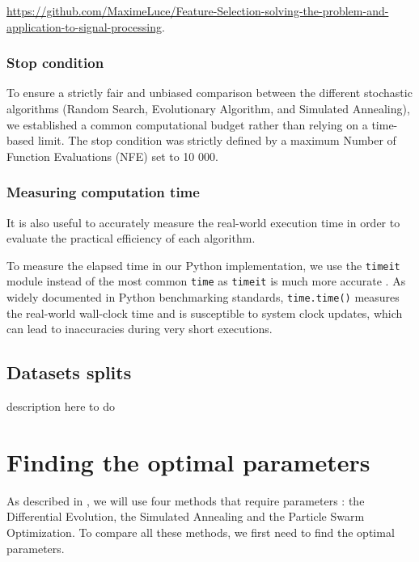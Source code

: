 \documentclass[12pt, openany]{article}
\begin{document}
\href{https://github.com/MaximeLuce/Feature-Selection-solving-the-problem-and-application-to-signal-processing}{\small https://github.com/MaximeLuce/Feature-Selection-solving-the-problem-and-application-to-signal-processing}.


\subsubsection{Stop condition}\label{sec:stop_condition}

To ensure a strictly fair and unbiased comparison between the different stochastic algorithms (Random Search, Evolutionary Algorithm, and Simulated Annealing), we established a common computational budget rather than relying on a time-based limit. The stop condition was strictly defined by a maximum Number of Function Evaluations (NFE) set to 10 000. 
 

\subsubsection{Measuring computation time}\label{sec:computation_time}

It is also useful to accurately measure the real-world execution time in order to evaluate the practical efficiency of each algorithm.

To measure the elapsed time in our Python implementation, we use the \texttt{timeit} module instead of the most common \texttt{time} as \texttt{timeit} is much more accurate \cite{so_time_vs_timeit_2013}. As widely documented in Python benchmarking standards, \texttt{time.time()} measures the real-world wall-clock time and is susceptible to system clock updates, which can lead to inaccuracies during very short executions.


\subsection{Datasets splits}

{\color{blue} description here to do}

\section{Finding the optimal parameters}\label{sec:finding_optimal_parameters}

As described in , we will use four methods that require parameters : the Differential Evolution, the Simulated Annealing and the Particle Swarm Optimization. To compare all these methods, we first need to find the optimal parameters.
\end{document}
